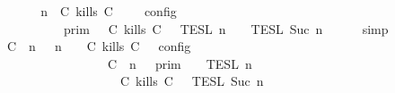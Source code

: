 \begin{isabellebody}
%
\isadelimproof
%
\endisadelimproof
%
\isatagproof
{}\isamarkupfalse%
\ {\isacharminus}\isanewline
\ \ \isamarkupfalse%
\ {\isacartoucheopen}{\isasymlbrakk}\ {\isasymGamma}{\isacharcomma}\ n\ {\isasymTurnstile}\ {\isacharparenleft}{\isacharparenleft}C\ kills\ C\ {\isacharhash}\ {\isasymPsi}{\isacharparenright}\ {\isasymtriangleright}\ {\isasymPhi}\ {\isasymrbrakk}\isactrlsub c\isactrlsub o\isactrlsub n\isactrlsub f\isactrlsub i\isactrlsub g\isanewline
\ \ \ \ \ \ \ \ {\isacharequal}\ {\isasymlbrakk}{\isasymlbrakk}\ {\isasymGamma}\ {\isasymrbrakk}{\isasymrbrakk}\isactrlsub p\isactrlsub r\isactrlsub i\isactrlsub m\ {\isasyminter}\ {\isasymlbrakk}{\isasymlbrakk}\ {\isacharparenleft}C\ kills\ C\ {\isacharhash}\ {\isasymPsi}\ {\isasymrbrakk}{\isasymrbrakk}\isactrlsub T\isactrlsub E\isactrlsub S\isactrlsub L\isactrlbsup {\isasymge}\ n\isactrlesup \ {\isasyminter}\ {\isasymlbrakk}{\isasymlbrakk}\ {\isasymPhi}\ {\isasymrbrakk}{\isasymrbrakk}\isactrlsub T\isactrlsub E\isactrlsub S\isactrlsub L\isactrlbsup {\isasymge}\ Suc\ n\isactrlesup {\isacartoucheclose}\isanewline
\ \ \ \ \isamarkupfalse%
\ simp\isanewline
\ \ \isamarkupfalse%
\ \isamarkupfalse%
\ {\isacartoucheopen}{\isasymlbrakk}\ {\isacharparenleft}{\isacharparenleft}C\ {\isasymnot}{\isasymUp}\ n{\isacharparenright}\ {\isacharhash}\ {\isasymGamma}{\isacharparenright}{\isacharcomma}\ n\ {\isasymTurnstile}\ {\isasymPsi}\ {\isasymtriangleright}\ {\isacharparenleft}{\isacharparenleft}C\ kills\ C\ {\isacharhash}\ {\isasymPhi}{\isacharparenright}\ {\isasymrbrakk}\isactrlsub c\isactrlsub o\isactrlsub n\isactrlsub f\isactrlsub i\isactrlsub g\isanewline
\ \ \ \ \ \ \ \ \ \ \ \ \ \ \ \ {\isacharequal}\ {\isasymlbrakk}{\isasymlbrakk}\ {\isacharparenleft}C\ {\isasymnot}{\isasymUp}\ n{\isacharparenright}\ {\isacharhash}\ {\isasymGamma}\ {\isasymrbrakk}{\isasymrbrakk}\isactrlsub p\isactrlsub r\isactrlsub i\isactrlsub m\ {\isasyminter}\ {\isasymlbrakk}{\isasymlbrakk}\ {\isasymPsi}\ {\isasymrbrakk}{\isasymrbrakk}\isactrlsub T\isactrlsub E\isactrlsub S\isactrlsub L\isactrlbsup {\isasymge}\ n\isactrlesup \isanewline
\ \ \ \ \ \ \ \ \ \ \ \ \ \ \ \ \ \ {\isasyminter}\ {\isasymlbrakk}{\isasymlbrakk}\ {\isacharparenleft}C\ kills\ C\ {\isacharhash}\ {\isasymPhi}\ {\isasymrbrakk}{\isasymrbrakk}\isactrlsub T\isactrlsub E\isactrlsub S\isactrlsub L\isactrlbsup {\isasymge}\ Suc\ n\isactrlesup {\isacartoucheclose}\ \isamarkupfalse%

\end{isabellebody}
